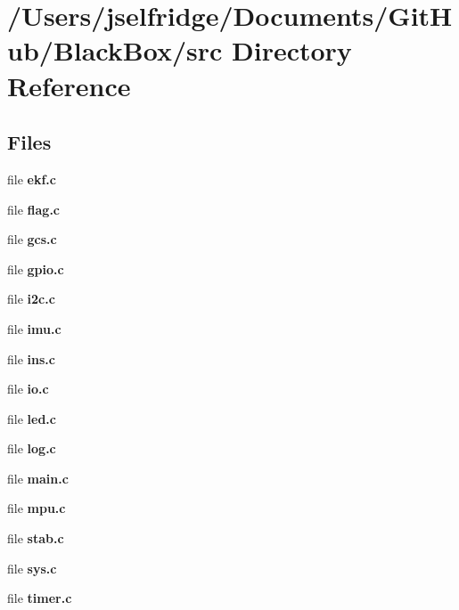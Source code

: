 \section{/\+Users/jselfridge/\+Documents/\+Git\+Hub/\+Black\+Box/src Directory Reference}
\label{dir_68267d1309a1af8e8297ef4c3efbcdba}
\subsection*{Files}
\begin{DoxyCompactItemize}
\item 
file \textbf{ ekf.\+c}
\item 
file \textbf{ flag.\+c}
\item 
file \textbf{ gcs.\+c}
\item 
file \textbf{ gpio.\+c}
\item 
file \textbf{ i2c.\+c}
\item 
file \textbf{ imu.\+c}
\item 
file \textbf{ ins.\+c}
\item 
file \textbf{ io.\+c}
\item 
file \textbf{ led.\+c}
\item 
file \textbf{ log.\+c}
\item 
file \textbf{ main.\+c}
\item 
file \textbf{ mpu.\+c}
\item 
file \textbf{ stab.\+c}
\item 
file \textbf{ sys.\+c}
\item 
file \textbf{ timer.\+c}
\end{DoxyCompactItemize}
